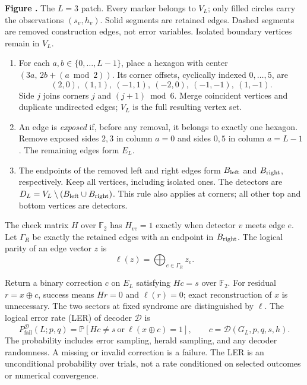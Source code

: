 \documentclass[11pt,letterpaper]{article}
\newcommand{\sect}[1]{\vspace{0.55em}{\large\sffamily\bfseries\color{ink}#1}\par\vspace{0.15em}}
\newcommand{\F}{\mathbb F_2}
\newcommand{\Prob}{\mathbb P}
\newcommand{\loss}{P_{\mathrm{fail}}}
\begin{document}
\label{fig:lattice}
{\small\textbf{Figure \thefigure.} The $L=3$ patch. Every marker belongs to
$V_L$; only filled circles carry the observations $(s_v,h_v)$. Solid segments
are retained edges. Dashed segments are removed construction edges, not error
variables. Isolated boundary vertices remain in $V_L$.\par}

\begin{enumerate}
\item For each $a,b\in\{0,\ldots,L-1\}$, place a hexagon with center
$(3a,\,2b+(a\bmod2))$. Its corner offsets, cyclically indexed $0,\ldots,5$, are
\[
 (2,0),\ (1,1),\ (-1,1),\ (-2,0),\ (-1,-1),\ (1,-1).
\]
Side $j$ joins corners $j$ and $(j+1)\bmod6$. Merge coincident vertices and
duplicate undirected edges; $V_L$ is the full resulting vertex set.
\item An edge is \emph{exposed} if, before any removal, it belongs to exactly
one hexagon. Remove exposed sides $2,3$ in column $a=0$ and sides $0,5$ in
column $a=L-1$. The remaining edges form $E_L$.
\item The endpoints of the removed left and right edges form $B_{\rm left}$
and $B_{\rm right}$, respectively. Keep all vertices, including isolated ones.
The detectors are $D_L=V_L\setminus(B_{\rm left}\cup B_{\rm right})$.
This rule also applies at corners; all other top and bottom vertices are detectors.
\end{enumerate}

The check matrix $H$ over $\F$ has $H_{ve}=1$ exactly when detector $v$ meets
edge $e$. Let $\Gamma_R$ be exactly the retained edges with an endpoint in
$B_{\rm right}$. The logical parity of an edge vector $z$ is
\[
                    \ell(z)=\bigoplus_{e\in\Gamma_R}z_e.
\]

\sect{4. What constitutes successful decoding?}
Return a binary correction $c$ on $E_L$ satisfying $Hc=s$ over $\F$.
For residual $r=x\oplus c$, success means $Hr=0$ and $\ell(r)=0$;
exact reconstruction of $x$ is unnecessary. The two sectors at fixed syndrome
are distinguished by $\ell$. The logical error rate (LER) of decoder $\mathcal D$ is
\[
 \loss^{\mathcal D}(L;p,q)=
 \Prob\!\left[Hc\ne s\ \text{or}\ \ell(x\oplus c)=1\right],
 \qquad c=\mathcal D(G_L,p,q,s,h).
\]
The probability includes error sampling, herald sampling, and any decoder
randomness. A missing or invalid correction is a failure. The LER is an
unconditional probability over trials, not a rate conditioned on selected
outcomes or numerical convergence.
\end{document}
